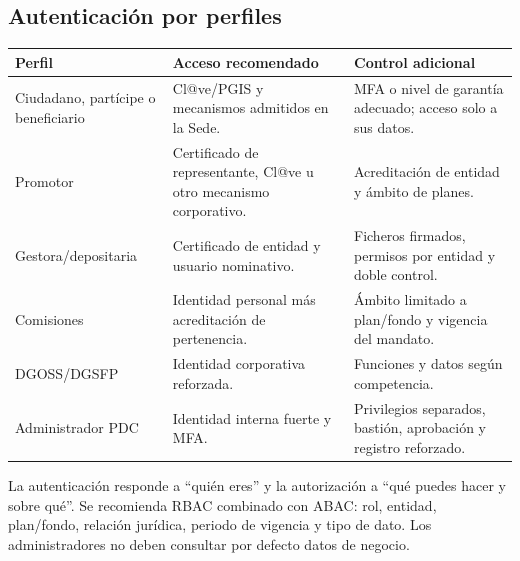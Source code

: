 \documentclass[11pt,a4paper]{article}
\begin{document}
\subsection{Autenticación por perfiles}
\begin{center}
\begin{tabularx}{0.95\textwidth}{l Y Y}\toprule
\textbf{Perfil} & \textbf{Acceso recomendado} & \textbf{Control adicional}\\\midrule
Ciudadano, partícipe o beneficiario & Cl@ve/PGIS y mecanismos admitidos en la Sede. & MFA o nivel de garantía adecuado; acceso solo a sus datos.\\
Promotor & Certificado de representante, Cl@ve u otro mecanismo corporativo. & Acreditación de entidad y ámbito de planes.\\
Gestora/depositaria & Certificado de entidad y usuario nominativo. & Ficheros firmados, permisos por entidad y doble control.\\
Comisiones & Identidad personal más acreditación de pertenencia. & Ámbito limitado a plan/fondo y vigencia del mandato.\\
DGOSS/DGSFP & Identidad corporativa reforzada. & Funciones y datos según competencia.\\
Administrador PDC & Identidad interna fuerte y MFA. & Privilegios separados, bastión, aprobación y registro reforzado.\\\bottomrule
\end{tabularx}\end{center}

La autenticación responde a ``quién eres'' y la autorización a ``qué puedes hacer y sobre qué''. Se recomienda RBAC combinado con ABAC: rol, entidad, plan/fondo, relación jurídica, periodo de vigencia y tipo de dato. Los administradores no deben consultar por defecto datos de negocio.
\end{document}
